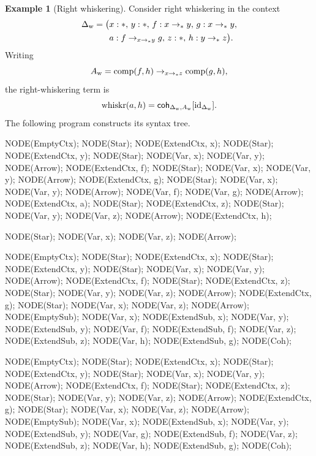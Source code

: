 \documentclass{article}%
\theoremstyle{remark}
\theoremstyle{definition}
\newtheorem{example}[theorem]{Example}
\theoremstyle{definition}
\theoremstyle{plain}
\begin{document}
\begin{example}[Right whiskering]
\label{ex:whiskr}
Consider right whiskering in the context
\[
  \begin{aligned}
    \Delta_{\mathrm{w}} = \bigl(
      &x:\obj,\,
       y:\obj,\,
       f:\arr[\obj]{x}{y},\,
       g:\arr[\obj]{x}{y},\\
      &a:\arr[{\arr[\obj]{x}{y}}]{f}{g},\,
       z:\obj,\,
       h:\arr[\obj]{y}{z}
    \bigr).
  \end{aligned}
\]
Writing
\[
  A_{\mathrm{w}}
  =
  \arr[{\arr[\obj]{x}{z}}]
      {\operatorname{comp}(f,h)}
      {\operatorname{comp}(g,h)},
\]
the right-whiskering term is
\[
  \operatorname{whiskr}(a,h)
  =
  \coh_{\Delta_{\mathrm{w}},A_{\mathrm{w}}}
      [\mathrm{id}_{\Delta_{\mathrm{w}}}].
\]
The following program constructs its syntax tree.

\begin{githubcode}
NODE(EmptyCtx);
NODE(Star); NODE(ExtendCtx, x);
NODE(Star); NODE(ExtendCtx, y);
NODE(Star); NODE(Var, x); NODE(Var, y); NODE(Arrow);
NODE(ExtendCtx, f);
NODE(Star); NODE(Var, x); NODE(Var, y); NODE(Arrow);
NODE(ExtendCtx, g);
NODE(Star); NODE(Var, x); NODE(Var, y); NODE(Arrow);
NODE(Var, f); NODE(Var, g); NODE(Arrow);
NODE(ExtendCtx, a);
NODE(Star); NODE(ExtendCtx, z);
NODE(Star); NODE(Var, y); NODE(Var, z); NODE(Arrow);
NODE(ExtendCtx, h);

NODE(Star); NODE(Var, x); NODE(Var, z); NODE(Arrow);

NODE(EmptyCtx);
NODE(Star); NODE(ExtendCtx, x);
NODE(Star); NODE(ExtendCtx, y);
NODE(Star); NODE(Var, x); NODE(Var, y); NODE(Arrow);
NODE(ExtendCtx, f);
NODE(Star); NODE(ExtendCtx, z);
NODE(Star); NODE(Var, y); NODE(Var, z); NODE(Arrow);
NODE(ExtendCtx, g);
NODE(Star); NODE(Var, x); NODE(Var, z); NODE(Arrow);
NODE(EmptySub);
NODE(Var, x); NODE(ExtendSub, x);
NODE(Var, y); NODE(ExtendSub, y);
NODE(Var, f); NODE(ExtendSub, f);
NODE(Var, z); NODE(ExtendSub, z);
NODE(Var, h); NODE(ExtendSub, g);
NODE(Coh);

NODE(EmptyCtx);
NODE(Star); NODE(ExtendCtx, x);
NODE(Star); NODE(ExtendCtx, y);
NODE(Star); NODE(Var, x); NODE(Var, y); NODE(Arrow);
NODE(ExtendCtx, f);
NODE(Star); NODE(ExtendCtx, z);
NODE(Star); NODE(Var, y); NODE(Var, z); NODE(Arrow);
NODE(ExtendCtx, g);
NODE(Star); NODE(Var, x); NODE(Var, z); NODE(Arrow);
NODE(EmptySub);
NODE(Var, x); NODE(ExtendSub, x);
NODE(Var, y); NODE(ExtendSub, y);
NODE(Var, g); NODE(ExtendSub, f);
NODE(Var, z); NODE(ExtendSub, z);
NODE(Var, h); NODE(ExtendSub, g);
NODE(Coh);


\end{githubcode}
\end{example}
\end{document}
